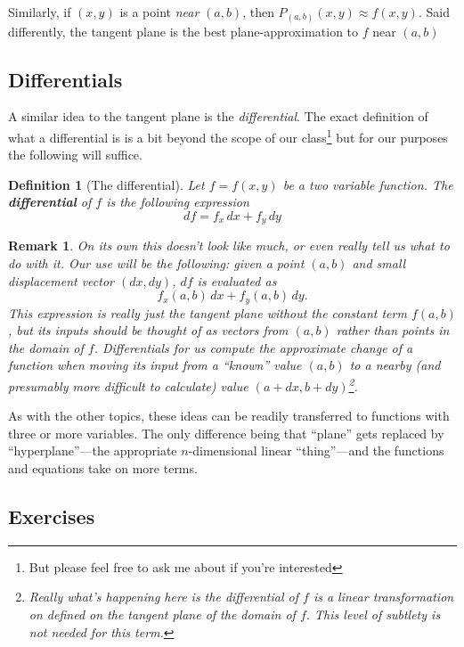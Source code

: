 \documentclass[12pt]{article}
\numberwithin{equation}{subsection}
\numberwithin{figure}{subsection}
\newtheorem{defn}[subsection]{Definition}
\theoremstyle{note}
\newtheorem{remark}[subsection]{Remark}
\begin{document}
{Similarly, if $(x,y)$ is a point \textit{near} $(a,b)$, then $P_{(a,b)}(x,y)\approx f(x,y)$. Said differently, the tangent plane is the best plane-approximation to $f$ near $(a,b)$

\subsection{Differentials}
A similar idea to the tangent plane is the \textit{differential}. The exact definition of what a differential is is a bit beyond the scope of our class\footnote{But please feel free to ask me about if you're interested} but for our purposes the following will suffice.

\begin{defn}[The differential] Let $f=f(x,y)$ be a two variable function. The \textbf{differential} of $f$ is the following expression \begin{equation} \label{diff} df=f_x \,dx+f_y \,dy \end{equation}
\end{defn}

\begin{remark}On its own this doesn't look like much, or even really tell us what to do with it. Our use will be the following: given a point $(a,b)$ and small displacement vector $(d x, d y)$, $df$ is evaluated as \[f_x(a,b)\, d x+f_y(a,b) \, d y.\] This expression is really just the tangent plane without the constant term $f(a,b)$, but its inputs should be thought of as vectors from $(a,b)$ rather than points in the domain of $f$. Differentials for us compute the \textit{approximate change} of a function when moving its input from a ``known'' value $(a,b)$ to a nearby (and presumably more difficult to calculate) value $(a+d x, b+d y)$\footnote{Really what's happening here is the differential of $f$ is a \textit{linear transformation} on defined on the tangent plane of the domain of $f$. This level of subtlety is not needed for this term. }. 
\end{remark}

As with the other topics, these ideas can be readily transferred to functions with three or more variables. The only difference being that ``plane'' gets replaced by ``hyperplane''---the appropriate $n$-dimensional linear ``thing''---and the functions and equations take on more terms.

\subsection{Exercises}

}
\end{document}
